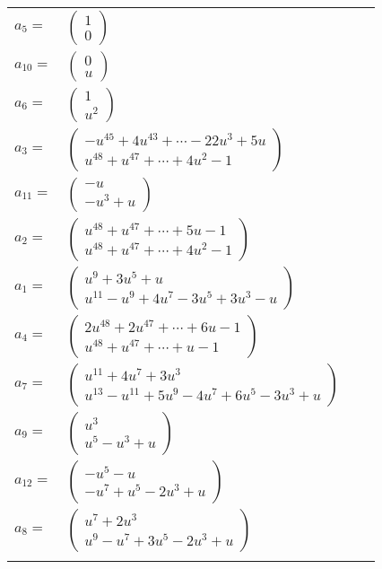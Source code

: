 \documentclass[1p]{elsarticle_modified}
\theoremstyle{definition}
\begin{document}
\begin{tabular}{m{7pt} m{180pt} m{7pt} m{180pt} }
\flushright $a_{5}=$&$\begin{pmatrix}1\\0\end{pmatrix}$ \\
\flushright $a_{10}=$&$\begin{pmatrix}0\\u\end{pmatrix}$ \\
\flushright $a_{6}=$&$\begin{pmatrix}1\\u^2\end{pmatrix}$ \\
\flushright $a_{3}=$&$\begin{pmatrix}- u^{45}+4 u^{43}+\cdots-22 u^3+5 u\\u^{48}+u^{47}+\cdots+4 u^2-1\end{pmatrix}$ \\
\flushright $a_{11}=$&$\begin{pmatrix}- u\\- u^3+u\end{pmatrix}$ \\
\flushright $a_{2}=$&$\begin{pmatrix}u^{48}+u^{47}+\cdots+5 u-1\\u^{48}+u^{47}+\cdots+4 u^2-1\end{pmatrix}$ \\
\flushright $a_{1}=$&$\begin{pmatrix}u^9+3 u^5+u\\u^{11}- u^9+4 u^7-3 u^5+3 u^3- u\end{pmatrix}$ \\
\flushright $a_{4}=$&$\begin{pmatrix}2 u^{48}+2 u^{47}+\cdots+6 u-1\\u^{48}+u^{47}+\cdots+u-1\end{pmatrix}$ \\
\flushright $a_{7}=$&$\begin{pmatrix}u^{11}+4 u^7+3 u^3\\u^{13}- u^{11}+5 u^9-4 u^7+6 u^5-3 u^3+u\end{pmatrix}$ \\
\flushright $a_{9}=$&$\begin{pmatrix}u^3\\u^5- u^3+u\end{pmatrix}$ \\
\flushright $a_{12}=$&$\begin{pmatrix}- u^5- u\\- u^7+u^5-2 u^3+u\end{pmatrix}$ \\
\flushright $a_{8}=$&$\begin{pmatrix}u^7+2 u^3\\u^9- u^7+3 u^5-2 u^3+u\end{pmatrix}$\\&\end{tabular}
\end{document}
